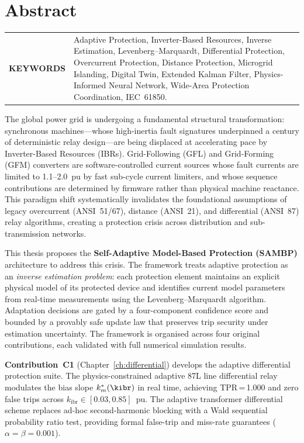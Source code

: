 \chapter{Abstract}

\begin{tabular}{@{} >{\bfseries}p{} p{} @{}}
\MakeUppercase{Keywords} &
Adaptive Protection, Inverter-Based Resources, Inverse Estimation,
Levenberg--Marquardt, Differential Protection, Overcurrent Protection,
Distance Protection, Microgrid Islanding, Digital Twin, Extended Kalman Filter,
Physics-Informed Neural Network, Wide-Area Protection Coordination, IEC~61850.
\end{tabular}
\par

\begin{doublespacing}

The global power grid is undergoing a fundamental structural transformation:
synchronous machines---whose high-inertia fault signatures underpinned a century
of deterministic relay design---are being displaced at accelerating pace by
Inverter-Based Resources (IBRs). Grid-Following (GFL) and Grid-Forming (GFM)
converters are software-controlled current sources whose fault currents are
limited to 1.1--2.0~pu by fast sub-cycle current limiters, and whose sequence
contributions are determined by firmware rather than physical machine reactance.
This paradigm shift systematically invalidates the foundational assumptions of
legacy overcurrent (ANSI~51/67), distance (ANSI~21), and differential (ANSI~87)
relay algorithms, creating a protection crisis across distribution and
sub-transmission networks.

This thesis proposes the \textbf{Self-Adaptive Model-Based Protection (SAMBP)}
architecture to address this crisis. The framework treats adaptive protection
as an \emph{inverse estimation problem}: each protection element maintains an
explicit physical model of its protected device and identifies current model
parameters from real-time measurements using the Levenberg--Marquardt algorithm.
Adaptation decisions are gated by a four-component confidence score and bounded
by a provably safe update law that preserves trip security under estimation
uncertainty. The framework is organised across four original contributions,
each validated with full numerical simulation results.

\textbf{Contribution~C1} (Chapter~\ref{ch:differential}) develops the
adaptive differential protection suite. The physics-constrained adaptive 87L
line differential relay modulates the bias slope $k_m^*(\kibr)$ in real time,
achieving TPR\,=\,1.000 and zero false trips across
$k_\mathrm{ibr} \in [0.03, 0.85]$~pu. The adaptive transformer differential
scheme replaces ad-hoc second-harmonic blocking with a Wald sequential
probability ratio test, providing formal false-trip and miss-rate guarantees
($\alpha = \beta = 0.001$).


\end{doublespacing}
